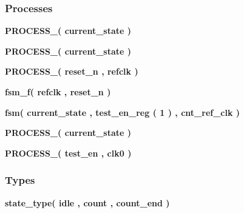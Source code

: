 \subsubsection*{Processes}
 \begin{DoxyCompactItemize}
\item 
{\bf P\+R\+O\+C\+E\+S\+S\+\_}{\bfseries  ( {\bfseries {\bfseries {\bf current\+\_\+state}} \textcolor{vhdlchar}{ }} )}
\item 
{\bf P\+R\+O\+C\+E\+S\+S\+\_}{\bfseries  ( {\bfseries {\bfseries {\bf current\+\_\+state}} \textcolor{vhdlchar}{ }} )}
\item 
{\bf P\+R\+O\+C\+E\+S\+S\+\_}{\bfseries  ( {\bfseries {\bfseries {\bf reset\+\_\+n}} \textcolor{vhdlchar}{ }} , {\bfseries {\bfseries {\bf refclk}} \textcolor{vhdlchar}{ }} )}
\item 
{\bf fsm\+\_\+f}{\bfseries  ( {\bfseries {\bfseries {\bf refclk}} \textcolor{vhdlchar}{ }} , {\bfseries {\bfseries {\bf reset\+\_\+n}} \textcolor{vhdlchar}{ }} )}
\item 
{\bf fsm}{\bfseries  ( {\bfseries {\bfseries {\bf current\+\_\+state}} \textcolor{vhdlchar}{ }} , {\bfseries {\bfseries {\bf test\+\_\+en\+\_\+reg}} \textcolor{vhdlchar}{(}\textcolor{vhdlchar}{ } \textcolor{vhdldigit}{1} \textcolor{vhdlchar}{)}\textcolor{vhdlchar}{ }} , {\bfseries {\bfseries {\bf cnt\+\_\+ref\+\_\+clk}} \textcolor{vhdlchar}{ }} )}
\item 
{\bf P\+R\+O\+C\+E\+S\+S\+\_}{\bfseries  ( {\bfseries {\bfseries {\bf current\+\_\+state}} \textcolor{vhdlchar}{ }} )}
\item 
{\bf P\+R\+O\+C\+E\+S\+S\+\_}{\bfseries  ( {\bfseries {\bfseries {\bf test\+\_\+en}} \textcolor{vhdlchar}{ }} , {\bfseries {\bfseries {\bf clk0}} \textcolor{vhdlchar}{ }} )}
\end{DoxyCompactItemize}
\subsubsection*{Types}
 \begin{DoxyCompactItemize}
\item 
{\bfseries {\bf state\+\_\+type}{\bfseries \textcolor{vhdlchar}{(}\textcolor{vhdlchar}{ }\textcolor{vhdlchar}{idle}\textcolor{vhdlchar}{ }\textcolor{vhdlchar}{,}\textcolor{vhdlchar}{ }\textcolor{vhdlchar}{count}\textcolor{vhdlchar}{ }\textcolor{vhdlchar}{,}\textcolor{vhdlchar}{ }\textcolor{vhdlchar}{count\+\_\+end}\textcolor{vhdlchar}{ }\textcolor{vhdlchar}{)}\textcolor{vhdlchar}{ }}} 
\end{DoxyCompactItemize}
